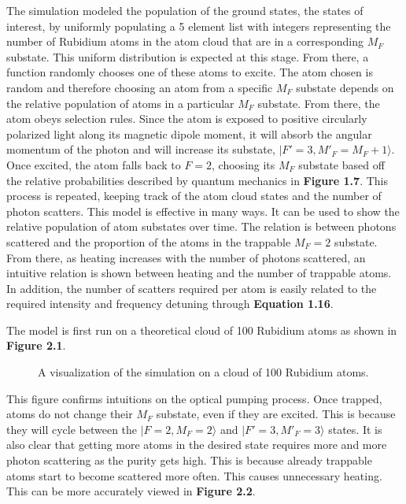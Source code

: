 The simulation modeled the population of the ground states, the states of interest, by uniformly populating a 5 element list with integers representing the number of Rubidium atoms in the atom cloud that are in a corresponding $M_F$ substate. This uniform distribution is expected at this stage. From there, a function randomly chooses one of these atoms to excite. The atom chosen is random and therefore choosing an atom from a specific $M_F$ substate depends on the relative population of atoms in a particular $M_F$ substate. From there, the atom obeys selection rules. Since the atom is exposed to positive circularly polarized light along its magnetic dipole moment, it will absorb the angular momentum of the photon and will increase its substate, $|F'=3, M'_F = M_F + 1 \rangle$. Once excited, the atom falls back to $F=2$, choosing its $M_F$ substate based off the relative probabilities described by quantum mechanics in \textbf{Figure 1.7}. This process is repeated, keeping track of the atom cloud states and the number of photon scatters. This model is effective in many ways. It can be used to show the relative population of atom substates over time. The relation is between photons scattered and the proportion of the atoms in the trappable $M_F=2$ substate. From there, as heating increases with the number of photons scattered, an intuitive relation is shown between heating and the number of trappable atoms. In addition, the number of scatters required per atom is easily related to the required intensity and frequency detuning through \textbf{Equation 1.16}.

The model is first run on a theoretical cloud of 100 Rubidium atoms as shown in \textbf{Figure 2.1}.



\begin{figure}[h!]
\begin{center}
\end{center}
\caption{A visualization of the simulation on a cloud of 100 Rubidium atoms. }
\end{figure}

This figure confirms intuitions on the optical pumping process. Once trapped, atoms do not change their $M_F$ substate, even if they are excited. This is because they will cycle between the $|F=2, M_F=2\rangle$ and $|F'=3, M'_F=3\rangle$ states. It is also clear that getting more atoms in the desired state requires more and more photon scattering as the purity gets high. This is because already trappable atoms start to become scattered more often. This causes unnecessary heating. This can be more accurately viewed in \textbf{Figure 2.2}.

